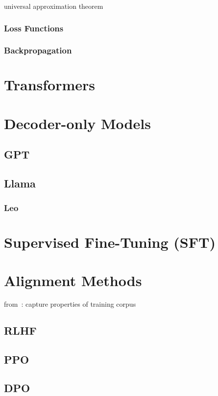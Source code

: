 universal approximation theorem

\subsubsection{Loss Functions}

\subsubsection{Backpropagation}


\section{Transformers}\label{sec:trans}


\section{Decoder-only Models}\label{sec:decoder}

\subsection{GPT}\label{subsec:gpt}

\subsection{Llama}\label{subsec:llama}

\subsubsection{Leo}


\section{Supervised Fine-Tuning (SFT)}\label{sec:supervised-fine-tuning}


\section{Alignment Methods}\label{sec:alignment-methods}
from~\autocite{zhao2023survey}:
capture properties of training corpus

\subsection{RLHF}\label{subsec:rlhf}

\subsection{PPO}\label{subsec:ppo}

\subsection{DPO}\label{subsec:dpo}
